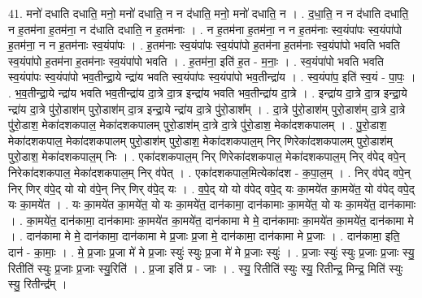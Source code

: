\documentclass[17pt]{extarticle}
\begin{document}
41. मनो॑ दधाति दधाति॒ मनो॒ मनो॑ दधाति॒ न न द॑धाति॒ मनो॒ मनो॑ दधाति॒ न । . द॒धा॒ति॒ न न द॑धाति दधाति॒ न ह॒तम॑ना ह॒तम॑ना॒ न द॑धाति दधाति॒ न ह॒तम॑नाः । . न ह॒तम॑ना ह॒तम॑ना॒ न न ह॒तम॑नाः स्व॒यंपा॑पः स्व॒यंपा॑पो ह॒तम॑ना॒ न न ह॒तम॑नाः स्व॒यंपा॑पः । . ह॒तम॑नाः स्व॒यंपा॑पः स्व॒यंपा॑पो ह॒तम॑ना ह॒तम॑नाः स्व॒यंपा॑पो भवति भवति स्व॒यंपा॑पो ह॒तम॑ना ह॒तम॑नाः स्व॒यंपा॑पो भवति । . ह॒तम॑ना॒ इति॑ ह॒त - म॒नाः॒ । . स्व॒यंपा॑पो भवति भवति स्व॒यंपा॑पः स्व॒यंपा॑पो भव॒तीन्द्रा॒ये न्द्रा॑य भवति स्व॒यंपा॑पः स्व॒यंपा॑पो भव॒तीन्द्रा॑य । . स्व॒यंपा॑प॒ इति॑ स्व॒यं - पा॒पः॒ । . भ॒व॒तीन्द्रा॒ये न्द्रा॑य भवति भव॒तीन्द्रा॑य दा॒त्रे दा॒त्र इन्द्रा॑य भवति भव॒तीन्द्रा॑य दा॒त्रे । . इन्द्रा॑य दा॒त्रे दा॒त्र इन्द्रा॒ये न्द्रा॑य दा॒त्रे पु॑रो॒डाश॑म् पुरो॒डाश॑म् दा॒त्र इन्द्रा॒ये न्द्रा॑य दा॒त्रे पु॑रो॒डाश᳚म् । . दा॒त्रे पु॑रो॒डाश॑म् पुरो॒डाश॑म् दा॒त्रे दा॒त्रे पु॑रो॒डाश॒ मेका॑दशकपाल॒ मेका॑दशकपालम् पुरो॒डाश॑म् दा॒त्रे दा॒त्रे पु॑रो॒डाश॒ मेका॑दशकपालम् । . पु॒रो॒डाश॒ मेका॑दशकपाल॒ मेका॑दशकपालम् पुरो॒डाश॑म् पुरो॒डाश॒ मेका॑दशकपाल॒म् निर् णिरेका॑दशकपालम् पुरो॒डाश॑म् पुरो॒डाश॒ मेका॑दशकपाल॒म् निः । . एका॑दशकपाल॒म् निर् णिरेका॑दशकपाल॒ मेका॑दशकपाल॒म् निर् व॑पेद् वपे॒न् निरेका॑दशकपाल॒ मेका॑दशकपाल॒म् निर् व॑पेत् । . एका॑दशकपाल॒मित्येका॑दश - क॒पा॒ल॒म् । . निर् व॑पेद् वपे॒न् निर् णिर् व॑पे॒द् यो यो व॑पे॒न् निर् णिर् व॑पे॒द् यः । . व॒पे॒द् यो यो व॑पेद् वपे॒द् यः का॒मये॑त का॒मये॑त॒ यो व॑पेद् वपे॒द् यः का॒मये॑त । . यः का॒मये॑त का॒मये॑त॒ यो यः का॒मये॑त॒ दान॑कामा॒ दान॑कामाः का॒मये॑त॒ यो यः का॒मये॑त॒ दान॑कामाः । . का॒मये॑त॒ दान॑कामा॒ दान॑कामाः का॒मये॑त का॒मये॑त॒ दान॑कामा मे मे॒ दान॑कामाः का॒मये॑त का॒मये॑त॒ दान॑कामा मे । . दान॑कामा मे मे॒ दान॑कामा॒ दान॑कामा मे प्र॒जाः प्र॒जा मे॒ दान॑कामा॒ दान॑कामा मे प्र॒जाः । . दान॑कामा॒ इति॒ दान॑ - का॒माः॒ । . मे॒ प्र॒जाः प्र॒जा मे॑ मे प्र॒जाः स्युः॑ स्युः प्र॒जा मे॑ मे प्र॒जाः स्युः॑ । . प्र॒जाः स्युः॑ स्युः प्र॒जाः प्र॒जाः स्यु॒ रितीति॑ स्युः प्र॒जाः प्र॒जाः स्यु॒रिति॑ । . प्र॒जा इति॑ प्र - जाः । . स्यु॒ रितीति॑ स्युः स्यु॒ रितीन्द्र॒ मिन्द्र॒ मिति॑ स्युः स्यु॒ रितीन्द्र᳚म् । \newline
\pagebreak
{}
\end{document}
